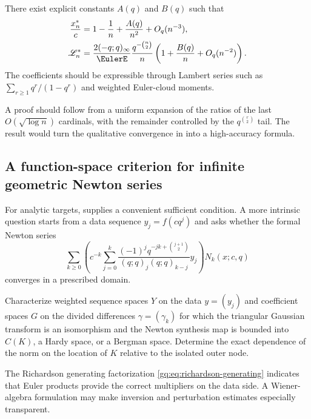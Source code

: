 \begin{conjecture}
\label{gq:conj:second-order-lebesgue}
There exist explicit constants $A(q)$ and $B(q)$ such that
\begin{align}
 \frac{x_n^*}{c}
 &=1-\frac1n+\frac{A(q)}{n^2}+O_q(n^{-3}),
 \label{gq:eq:second-order-peak-conj}\\
 \Leb_n^*
 &=\frac{2(-q;q)_\infty}{\EulerE}
   \frac{q^{-\binom n2}}{n}
   \left(1+\frac{B(q)}n+O_q(n^{-2})\right).
 \label{gq:eq:second-order-lambda-conj}
\end{align}
The coefficients should be expressible through Lambert series such as
$\sum_{r\ge1}q^r/(1-q^r)$ and weighted Euler-cloud moments.
\end{conjecture}

A proof should follow from a uniform expansion of the ratios of the last
$O(\sqrt{\log n})$ cardinals, with the remainder controlled by the
$q^{\binom r2}$ tail.  The result would turn the qualitative convergence in
 into a high-accuracy formula.

\subsection{A function-space criterion for infinite geometric Newton series}

For analytic targets,  supplies a
convenient sufficient condition.  A more intrinsic question starts from a
data sequence $y_j=f(cq^j)$ and asks whether the formal Newton series
\begin{equation}
 \sum_{k\ge0}
 \left(c^{-k}\sum_{j=0}^k
 \frac{(-1)^jq^{-jk+\binom{j+1}{2}}}
 {(q;q)_j(q;q)_{k-j}}y_j\right)N_k(x;c,q)
 \label{gq:eq:formal-data-newton-series}
\end{equation}
converges in a prescribed domain.

\begin{problem}
\label{gq:prob:newton-sequence-spaces}
Characterize weighted sequence spaces $Y$ on the data $y=(y_j)$ and
coefficient spaces $G$ on the divided differences $\gamma=(\gamma_k)$ for
which the triangular Gaussian transform is an isomorphism and the Newton
synthesis map is bounded into $C(K)$, a Hardy space, or a Bergman space.
Determine the exact dependence of the norm on the location of $K$ relative
to the isolated outer node.
\end{problem}

The Richardson generating factorization
\eqref{gq:eq:richardson-generating} indicates that Euler products provide the
correct multipliers on the data side.  A Wiener-algebra formulation may
make inversion and perturbation estimates especially transparent.

